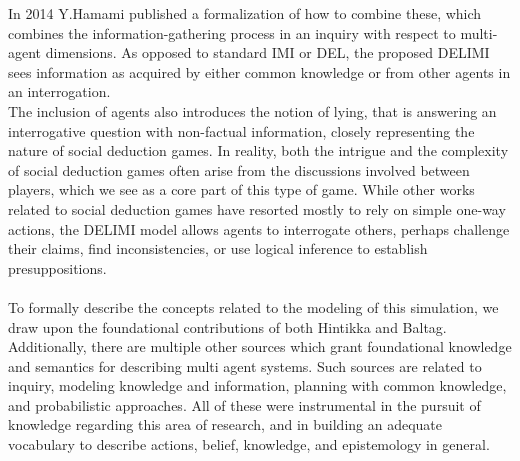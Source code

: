 In 2014 Y.Hamami\cite{delimi} published a formalization of how to combine
these, which combines the information-gathering process in an inquiry with
respect to multi-agent dimensions. As opposed to standard IMI or DEL, the
proposed DELIMI sees information as acquired by either common knowledge or from
other agents in an interrogation. \\
The inclusion of agents also introduces the
notion of lying, that is answering an interrogative question with non-factual
information, closely representing the nature of social deduction games. In
reality, both the intrigue and the complexity of social deduction games often
arise from the discussions involved between players, which we see as a core
part of this type of game. While other works related to social deduction games
have resorted mostly to rely on simple one-way actions, the DELIMI model allows
agents to interrogate others, perhaps challenge their claims, find
inconsistencies, or use logical inference to 
establish presuppositions.\\ \\
To formally describe the concepts related to the modeling of this simulation,
we draw upon the foundational contributions of both Hintikka\cite{hintikka} and
Baltag\cite{Baltag}. Additionally, there are multiple other sources which grant
foundational knowledge and semantics for describing multi agent systems. Such
sources are related to inquiry\cite{delimi}, modeling knowledge and
information\cite{modelling_multi_agent_epistemic_systems}, planning with common
knowledge\cite{multi_agent_epistemic_planner_common_knowledge}, and
probabilistic approaches\cite{probibalistic_multiagent_systems}. All of these
were instrumental in the pursuit of knowledge regarding this area of research,
and in building an adequate vocabulary to describe actions, belief, knowledge,
and epistemology in general.